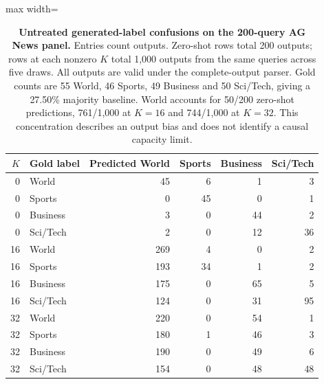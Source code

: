 \begin{table}[p]
\centering\color{blue}
\caption{\textbf{Untreated generated-label confusions on the 200-query AG News panel.} Entries count outputs. Zero-shot rows total 200 outputs; rows at each nonzero $K$ total 1,000 outputs from the same queries across five draws. All outputs are valid under the complete-output parser. Gold counts are 55 World, 46 Sports, 49 Business and 50 Sci/Tech, giving a 27.50\% majority baseline. World accounts for 50/200 zero-shot predictions, 761/1,000 at $K=16$ and 744/1,000 at $K=32$. This concentration describes an output bias and does not identify a causal capacity limit.}
\label{stab:final_confusions}
\footnotesize
\begin{adjustbox}{max width=\textwidth}
\begin{tabular}{rlrrrr}
\toprule
$K$ & Gold label & Predicted World & Sports & Business & Sci/Tech \\
\midrule
0 & World & 45 & 6 & 1 & 3 \\
0 & Sports & 0 & 45 & 0 & 1 \\
0 & Business & 3 & 0 & 44 & 2 \\
0 & Sci/Tech & 2 & 0 & 12 & 36 \\
16 & World & 269 & 4 & 0 & 2 \\
16 & Sports & 193 & 34 & 1 & 2 \\
16 & Business & 175 & 0 & 65 & 5 \\
16 & Sci/Tech & 124 & 0 & 31 & 95 \\
32 & World & 220 & 0 & 54 & 1 \\
32 & Sports & 180 & 1 & 46 & 3 \\
32 & Business & 190 & 0 & 49 & 6 \\
32 & Sci/Tech & 154 & 0 & 48 & 48 \\
\bottomrule
\end{tabular}
\end{adjustbox}
\end{table}

